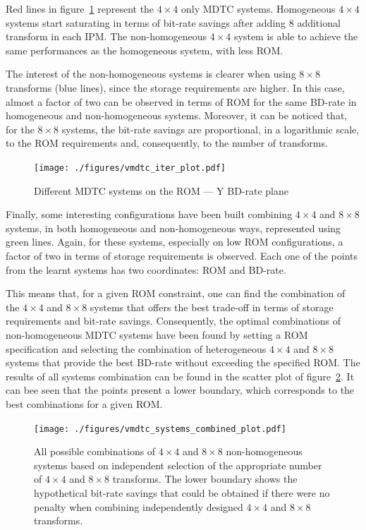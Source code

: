 \documentclass[11pt,a4paper,openright,twoside]{book}
\numberwithin{equation}{section} %
\numberwithin{figure}{section} %
\numberwithin{table}{section} %
\begin{document}
Red lines in figure~\ref{fig:vmdtc_iter} represent the $4\times4$ only
\ac{MDTC} systems.
Homogeneous $4\times4$ systems start saturating in terms of bit-rate savings
after adding 8 additional transform in each \ac{IPM}.
The non-homogeneous $4\times4$ system is able to achieve the same performances
as the homogeneous system, with less \acs{ROM}.

The interest of the non-homogeneous systems is clearer when using $8\times8$
transforms (blue lines), since the storage requirements are higher.
In this case, almost a factor of two can be observed in terms of \acs{ROM} for
the same \ac{BD}-rate in homogeneous and non-homogeneous systems.
Moreover, it can be noticed that, for the $8\times8$ systems, the bit-rate
savings are proportional, in a logarithmic scale, to the \acs{ROM}
requirements and, consequently, to the number of transforms.

\begin{figure}[tb]
	\centering
	\texttt{[image: ./figures/vmdtc\_iter\_plot.pdf]}
	\caption{Different \acs{MDTC} systems on the \acs{ROM} --- Y \acs{BD}-rate
	plane}
	\label{fig:vmdtc_iter}
\end{figure}

Finally, some interesting configurations have been built combining $4\times4$
and $8\times8$ systems, in both homogeneous and non-homogeneous ways,
represented using green lines.
Again, for these systems, especially on low \acs{ROM} configurations, a factor
of two in terms of storage requirements is observed.
Each one of the points from the learnt systems has two coordinates: \acs{ROM}
and \ac{BD}-rate.

This means that, for a given \acs{ROM} constraint, one can find the
combination of the $4\times4$ and $8\times8$ systems that offers the best
trade-off in terms of storage requirements and bit-rate savings.
Consequently, the optimal combinations of non-homogeneous \ac{MDTC} systems
have been found by setting a \acs{ROM} specification and selecting the
combination of heterogeneous $4\times4$ and $8\times8$ systems that provide
the best \ac{BD}-rate without exceeding the specified \acs{ROM}.
The results of all systems combination can be found in the scatter plot of
figure~\ref{fig:vmdtc_combined}.
It can bee seen that the points present a lower boundary, which corresponds to
the best combinations for a given \acs{ROM}.

\begin{figure}[tb]
	\centering
	\texttt{[image: ./figures/vmdtc\_systems\_combined\_plot.pdf]}
	\caption[All possible combinations of $4\times4$ and $8\times8$
	non-homogeneous systems]
	{All possible combinations of $4\times4$ and $8\times8$
	non-homogeneous systems based on independent selection of the appropriate
	number of $4\times4$ and $8\times8$ transforms.
	The lower boundary shows the hypothetical bit-rate savings that could be
	obtained if there were no penalty when combining independently designed
	$4\times4$ and $8\times8$ transforms.}
	\label{fig:vmdtc_combined}
\end{figure}
\end{document}
